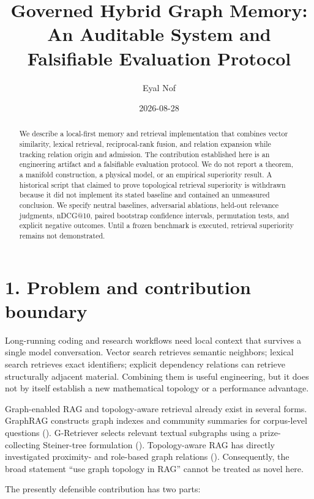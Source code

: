 \documentclass[
  english,
  11pt,
]{article}
\title{Governed Hybrid Graph Memory: An Auditable System and Falsifiable
Evaluation Protocol}
\author{Eyal Nof}
\date{2026-08-28}
\begin{document}
\maketitle
\begin{abstract}
We describe a local-first memory and retrieval implementation that
combines vector similarity, lexical retrieval, reciprocal-rank fusion,
and relation expansion while tracking relation origin and admission. The
contribution established here is an engineering artifact and a
falsifiable evaluation protocol. We do not report a theorem, a manifold
construction, a physical model, or an empirical superiority result. A
historical script that claimed to prove topological retrieval
superiority is withdrawn because it did not implement its stated
baseline and contained an unmeasured conclusion. We specify neutral
baselines, adversarial ablations, held-out relevance judgments, nDCG@10,
paired bootstrap confidence intervals, permutation tests, and explicit
negative outcomes. Until a frozen benchmark is executed, retrieval
superiority remains not demonstrated.
\end{abstract}

\section{1. Problem and contribution
boundary}\label{problem-and-contribution-boundary}

Long-running coding and research workflows need local context that
survives a single model conversation. Vector search retrieves semantic
neighbors; lexical search retrieves exact identifiers; explicit
dependency relations can retrieve structurally adjacent material.
Combining them is useful engineering, but it does not by itself
establish a new mathematical topology or a performance advantage.

Graph-enabled RAG and topology-aware retrieval already exist in several
forms. GraphRAG constructs graph indexes and community summaries for
corpus-level questions (). G-Retriever selects relevant textual subgraphs using a
prize-collecting Steiner-tree formulation
(). Topology-aware RAG
has directly investigated proximity- and role-based graph relations
(). Consequently, the
broad statement ``use graph topology in RAG'' cannot be treated as novel
here.

The presently defensible contribution has two parts:
\end{document}
